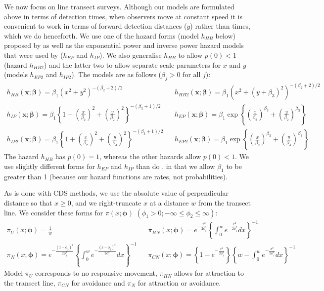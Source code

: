 \documentclass[useAMS,usenatbib,referee]{biom}
\begin{document}
We now focus on line transect surveys. Although our models are formulated above in terms of detection times, when observers move at constant speed it is convenient to work in terms of forward detection distances ($y$) rather than times, which we do henceforth. We use one of the hazard forms (model $h_{HB}$ below) proposed by \cite{Hayes+Buckland:83} as well as the exponential power and inverse power hazard models that were used by \cite{Langrock+al:13} ($h_{EP}$ and $h_{IP}$). We also generalise $h_{HB}$ to allow $p(0)<1$ (hazard $h_{HB2}$) and the latter two  to allow separate scale parameters for $x$ and $y$ (models $h_{EP2}$ and $h_{IP2}$). The models are as follows ($\beta_j>0$ for all $j$):
\begin{eqnarray}
h_{HB}(\boldsymbol{x};\boldsymbol{\beta})=\beta_1 (x^2+y^2)^{-(\beta_2+2)/2}& &
h_{HB2}(\boldsymbol{x};\boldsymbol{\beta})=\beta_1 (x^2+(y+\beta_3)^2)^{-(\beta_2+2)/2} \nonumber \\
h_{IP}(\boldsymbol{x};\boldsymbol{\beta})=\beta_1\left\{1+\left(\frac{x}{\beta_2}\right)^2+\left(\frac{y}{\beta_2}\right)^2\right\}^{-(\beta_3+1)/2}& &
h_{EP}(\boldsymbol{x};\boldsymbol{\beta})=\beta_1\exp\left\{\left(\frac{x}{\beta_2}\right)^{\beta_3}+\left(\frac{y}{\beta_2}\right)^{\beta_3}\right\} \nonumber \\
h_{IP2}(\boldsymbol{x};\boldsymbol{\beta})=\beta_1\left\{1+\left(\frac{x}{\beta_2}\right)^2+\left(\frac{y}{\beta_4}\right)^2\right\}^{-(\beta_3+1)/2}& &
h_{EP2}(\boldsymbol{x};\boldsymbol{\beta})=\beta_1\exp\left\{\left(\frac{x}{\beta_2}\right)^{\beta_3}+\left(\frac{y}{\beta_4}\right)^{\beta_3}\right\} \nonumber
\end{eqnarray}
The hazard $h_{HB}$ has $p(0)=1$, whereas the other hazards allow $p(0)<1$. We use slightly different forms for $h_{EP}$ and $h_{IP}$ than do \cite{Langrock+al:13}, in that we allow $\beta_1$ to be greater than 1 (because our hazard functions are rates, not probabilities). 

As is done with CDS methods, we use the absolute value of perpendicular distance so that $x\geq 0$, and we right-truncate $x$ at a distance $w$ from the transect line. We consider these forms for $\pi(x;\boldsymbol{\phi})$ $(\phi_1>0;-\infty\leq\phi_2\leq\infty)$:
\begin{eqnarray}
\pi_{U}(x;\boldsymbol{\phi})=\frac{1}{w}& &
\pi_{HN}(x;\boldsymbol{\phi})=e^{-\frac{x^2}{2\phi_1^2}}\left\{\int_0^we^{-\frac{x^2}{2\phi_1^2}}dx\right\}^{-1} \nonumber \\
\pi_{N}(x;\boldsymbol{\phi})=e^{-\frac{(x-\phi_2)^2}{2\phi_1^2}}\left\{\int_0^we^{-\frac{(x-\phi_2)^2}{2\phi_1^2}}dx\right\}^{-1}& &
\pi_{CN}(x;\boldsymbol{\phi})=\left\{1-e^{-\frac{x^2}{2\phi_1^2}}\right\}\left\{w-\int_0^we^{-\frac{x^2}{2\phi_1^2}}dx\right\}^{-1} \nonumber 
\end{eqnarray}
Model $\pi_{U}$ corresponds to no responsive movement,  $\pi_{HN}$ allows for attraction to the transect line, $\pi_{CN}$ for avoidance and $\pi_{N}$ for attraction or avoidance.
\end{document}
